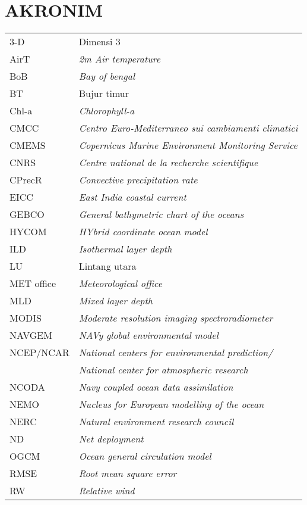 \section*{AKRONIM}
	\begin{tabular}{ll}
		3-D & Dimensi 3\\
		AirT & \textit{2m Air temperature}\\
		BoB & \textit{Bay of bengal}\\
		BT & Bujur timur\\
		Chl-a & \textit{Chlorophyll-a}\\
		CMCC & \textit{Centro Euro-Mediterraneo sui cambiamenti climatici}\\
		CMEMS & \textit{Copernicus Marine Environment Monitoring Service}\\
		CNRS & \textit{Centre national de la recherche scientifique}\\
		CPrecR & \textit{Convective precipitation rate}\\
		EICC & \textit{East India coastal current}\\
		GEBCO & \textit{General bathymetric chart of the oceans}\\
		HYCOM & \textit{HYbrid coordinate ocean model}\\
		ILD & \textit{Isothermal layer depth}\\
		LU & Lintang utara\\
		MET office & \textit{Meteorological office}\\
		MLD & \textit{Mixed layer depth}\\
		MODIS & \textit{Moderate resolution imaging spectroradiometer}\\
		NAVGEM & \textit{NAVy global environmental model}\\
		NCEP/NCAR & \textit{National centers for environmental prediction/} \\
		& \textit{National center for atmospheric research}\\
		NCODA & \textit{Navy coupled ocean data assimilation}\\
		NEMO & \textit{Nucleus for European modelling of the ocean}\\
		NERC & \textit{Natural environment research council}\\
		ND & \textit{Net deployment}\\
		OGCM & \textit{Ocean general circulation model}\\
		RMSE & \textit{Root mean square error} \\
		RW & \textit{Relative wind}\\

\end{tabular}
